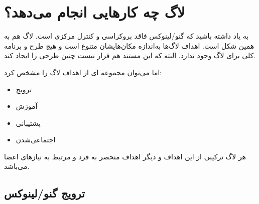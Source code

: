 \section{لاگ چه کارهایی انجام می‌دهد؟}

به یاد داشته باشید که گنو/لینوکس فاقد بروکراسی و کنترل مرکزی است.
لاگ هم به همین شکل است. اهداف لاگ‌ها به‌اندازه مکان‌هایشان متنوع است
و هیچ طرح و برنامه کلی برای لاگ وجود ندارد. البته که این مستند هم
قرار نیست چنین طرحی را ایجاد کند.

اما می‌توان مجموعه ای از اهداف لاگ را مشخص کرد:

\begin{itemize}
\item ترویج 
\item آموزش 
\item پشتیبانی 
\item اجتماعی‌شدن 
\end{itemize}

هر لاگ ترکیبی از این اهداف و دیگر اهداف منحصر به فرد و مرتبط
به نیاز‌های اعضا می‌باشد.

\subsection{ترویج گنو/لینوکس}


